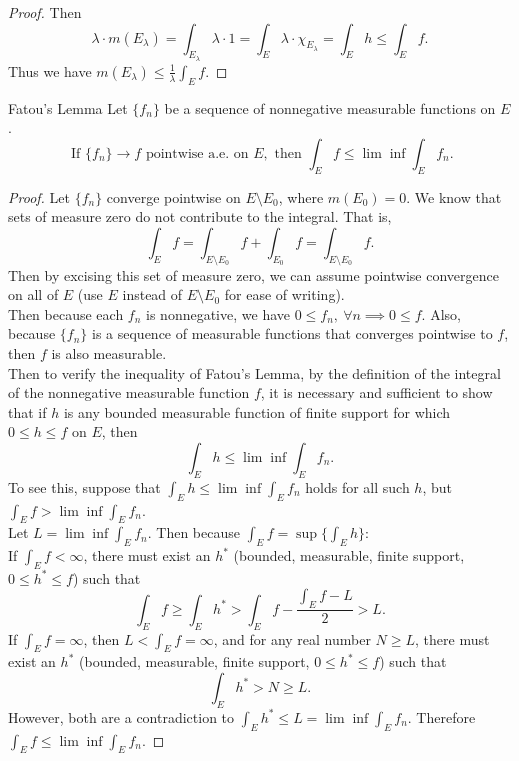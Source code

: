 \begin{flushleft}
\begin{proof}
        Then 
        \[
            \lambda\cdot m(E_\lambda)=\int_{E_{\lambda}}\lambda\cdot1=\int_E\lambda\cdot\chi_{E_{\lambda}}=\int_Eh\le\int_Ef.
        \]
        Thus we have $m(E_\lambda)\le\frac{1}{\lambda}\int_Ef$.
    \end{proof}
    \begin{namedthm*}{Fatou's Lemma}
        Let $\{f_n\}$ be a sequence of nonnegative measurable functions on $E$.
        \[
            \text{ If }\{f_n\}\to f\text{ pointwise a.e. on }E,\text{ then }\int_Ef\le\lim\inf\int_Ef_n.    
        \]
    \end{namedthm*}
    \begin{proof}
        Let $\{f_n\}$ converge pointwise on $E\setminus E_0$, where $m(E_0)=0$. 
        We know that sets of measure zero do not contribute to the integral. 
        That is,
        \[
            \int_Ef=\int_{E\setminus E_0}f+\int_{E_0}f=\int_{E\setminus E_0}f.
        \]
        Then by excising this set of measure zero, we can assume pointwise convergence on all of $E$ (use $E$ instead of $E\setminus E_0$ for ease of writing).
        \\Then because each $f_n$ is nonnegative, we have $0\le f_n,\ \forall n\implies 0\le f$.
        Also, because $\{f_n\}$ is a sequence of measurable functions that converges pointwise to $f$, then $f$ is also measurable.
        \\Then to verify the inequality of Fatou's Lemma, by the definition of the integral of the nonnegative measurable function $f$, it is necessary and sufficient to show that if $h$ is any bounded measurable function of finite support for which $0\le h\le f$ on $E$, then
        \[
            \int_Eh\le\lim\inf\int_Ef_n.
        \]
        To see this, suppose that $\int_Eh\le\lim\inf\int_Ef_n$ holds for all such $h$, but $\int_Ef>\lim\inf\int_Ef_n$.
        \\Let $L=\lim\inf\int_Ef_n$. Then because $\int_Ef=\sup\biggl\{\int_Eh \biggr\}$:
        \\If $\int_Ef<\infty$, there must exist an $h^*$ (bounded, measurable, finite support, $0\le h^*\le f$) such that
        \[
            \int_Ef\ge\int_Eh^*>\int_Ef-\frac{\int_Ef-L}{2}>L.
        \]
        If $\int_Ef=\infty$, then $L<\int_Ef=\infty$, and for any real number $N\ge L$, there must exist an $h^*$ (bounded, measurable, finite support, $0\le h^*\le f$) such that
        \[
            \int_Eh^*>N\ge L.
        \]
        However, both are a contradiction to $\int_Eh^*\le L=\lim\inf\int_Ef_n$.
        Therefore $\int_Ef\le\lim\inf\int_Ef_n$.

\end{proof}
\end{flushleft}
